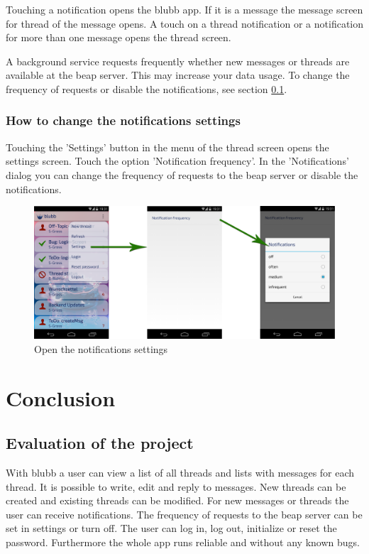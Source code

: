 \documentclass[12pt,a4paper,oneside]{report}
\newcommand{\appname}{blubb}
\newcommand{\beapServer}{beap server}
\begin{document}
Touching a notification opens the \appname{} app. If it is a message the message screen for thread of the message opens. A touch on a thread notification or a notification for more than one message opens the thread screen.

A background service requests frequently whether new messages or threads are available at the \beapServer{}. This may increase your data usage. To change the frequency of requests or disable the notifications, see section \ref{subsec:notificationSettings}.

\subsection{How to change the notifications settings}\label{subsec:notificationSettings}
Touching the 'Settings' button in the menu of the thread screen opens the settings screen. Touch the option 'Notification frequency'. In the 'Notifications' dialog you can change the frequency of requests to the \beapServer{} or disable the notifications. 
\begin{figure}[!ht]
    \includegraphics[width=\linewidth]{NotificationSettings.png}
    \caption{Open the notifications settings}
\end{figure}

\chapter{Conclusion}
\section{Evaluation of the project}
With \appname{} a user can view a list of all threads and lists with messages for each thread. It is possible to write, edit and reply to messages. New threads can be created and existing threads can be modified. For new messages or threads the user can receive notifications. The frequency of requests to the \beapServer{} can be set in settings or turn off. 
The user can log in, log out, initialize or reset the password. Furthermore the whole app runs reliable and without any known bugs.
\end{document}
